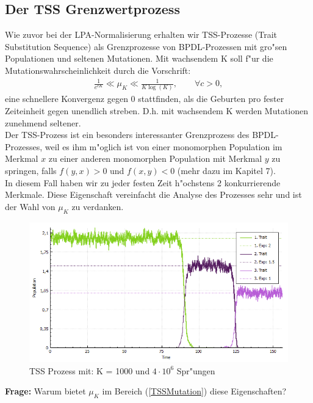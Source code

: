 \documentclass[11pt, a4paper, german]{article}
\theoremstyle{plain}
\begin{document}
	\subsection{Der TSS Grenzwertprozess}
	Wie zuvor bei der LPA-Normalisierung erhalten wir TSS-Prozesse (Trait Substitution Sequence) als Grenzprozesse von BPDL-Prozessen mit gro"sen Populationen und seltenen Mutationen. Mit wachsendem K  soll f"ur die Mutationswahrscheinlichkeit durch die Vorschrift:
	\begin{align}
		\frac{1}{e^{cK}} \ll \mu_K \ll \frac{1}{K \log(K)}, \qquad \forall c > 0, \label{TSSMutation}
	\end{align}
	eine schnellere Konvergenz gegen 0 stattfinden, als die Geburten pro fester Zeiteinheit gegen unendlich streben. D.h. mit wachsendem K werden Mutationen zunehmend seltener.\\ 
	Der TSS-Prozess ist ein besonders interessanter Grenzprozess des BPDL-Prozesses, weil es ihm m"oglich ist von einer monomorphen Population im Merkmal $ x $ zu einer anderen monomorphen Population mit Merkmal $ y $ zu springen, falls $ f(y,x) > 0 $ und $ f(x,y) < 0 $ (mehr dazu im Kapitel 7).\\
	In diesem Fall haben wir zu jeder festen Zeit h"ochstens 2 konkurrierende Merkmale. Diese Eigenschaft vereinfacht die Analyse des Prozesses sehr und ist der Wahl von $ \mu_K $ zu verdanken.\\
	\begin{figure}[H]
		\centering
		\includegraphics[width=1 \linewidth]{../BachelorArbeit/Pictures/TSS2_pure_small}
		\caption[TSS Prozess wechselnder Dominanz]{TSS Prozess mit: K = 1000 und $ 4 \cdot 10^6 $ Spr"ungen}
		\label{TSS_mitBPDLSimulator}
	\end{figure}
	\textbf{Frage:} Warum bietet $ \mu_K $ im Bereich (\ref{TSSMutation}) diese Eigenschaften?\\
	
\end{document}
